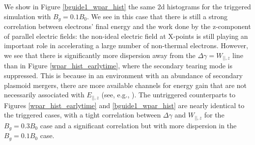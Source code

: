 We show in Figure \ref{bguide1_wpar_hist} the same 2d histograms for the triggered simulation with $B_{g}=0.1 B_{0}$.  We see in this case that there is still a strong correlation between electrons' final energy and the work done by the z-component of parallel electric fields: the non-ideal electric field at X-points is still playing an important role in accelerating a large number of non-thermal electrons.  However, we see that there is significantly more dispersion away from the $\Delta \gamma = W_{||,z}$ line than in Figure \ref{wpar_hist_earlytime}, where the secondary tearing mode is suppressed.  This is because in an environment with an abundance of secondary plasmoid mergers, there are more available channels for energy gain that are not necessarily associated with $E_{||,z}$ (see, e.g., \citealt{guo2019}).  The untriggered counterparts to Figures \ref{wpar_hist_earlytime} and \ref{bguide1_wpar_hist} are nearly identical to the triggered cases, with a tight correlation between $\Delta \gamma$ and $W_{||,z}$ for the $B_{g}=0.3B_{0}$ case and a significant correlation but with more dispersion in the $B_{g}=0.1B_{0}$ case.

